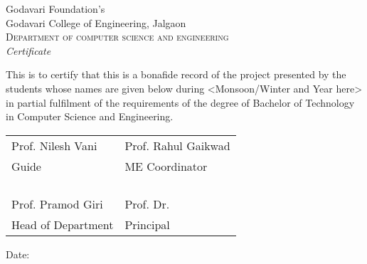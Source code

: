 \newpage
\thispagestyle{empty}

\begin{center}
\normalsize Godavari Foundation's\\
\huge{Godavari College of Engineering, Jalgaon}\\[0.5cm]
\normalsize
\textsc{Department of computer science and engineering}\\[2.0cm]

\emph{\LARGE Certificate}\\[2.5cm]
\end{center}
\normalsize This is to certify that this is a bonafide record of the project presented by the students whose names are given below during <Monsoon/Winter and Year here> in partial fulfilment of the requirements of the degree of Bachelor of Technology in Computer Science and Engineering.\\[1.0cm]

\begin{table}[h]
	\centering
	\begin{tabular}{m{10cm} m{4cm}}%

		Prof. Nilesh Vani & Prof. Rahul Gaikwad \\ 
		Guide & ME Coordinator \\  \\  \\  \\  \\
		Prof. Pramod Giri & Prof. Dr.  \\
		Head of Department & Principal
	\end{tabular}
\end{table}

\vfill



\begin{flushleft}
Date:
\end{flushleft}
